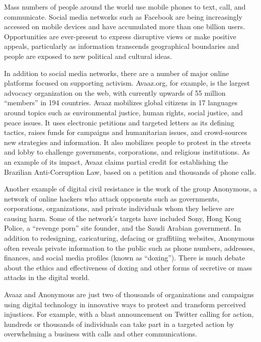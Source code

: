 \documentclass[twoside,a4paper,12pt,fleqn,openany]{extbook}
\begin{document}
Mass numbers of people around the world use mobile phones to text, call, and communicate. Social media networks such as Facebook are being increasingly accessed on mobile devices and have accumulated more than one billion users. Opportunities are ever-present to express disruptive views or make positive appeals, particularly as information transcends geographical boundaries and people are exposed to new political and cultural ideas.

In addition to social media networks, there are a number of major online platforms focused on supporting activism. Avaaz.org, for example, is the largest advocacy organization on the web, with currently upwards of 55 million “members” in 194 countries. Avaaz mobilizes global citizens in 17 languages around topics such as environmental justice, human rights, social justice, and peace issues. It uses electronic petitions and targeted letters as its defining tactics, raises funds for campaigns and humanitarian issues, and crowd-sources new strategies and information. It also mobilizes people to protest in the streets and lobby to challenge governments, corporations, and religious institutions. As an example of its impact, Avaaz claims partial credit for establishing the Brazilian Anti-Corruption Law, based on a petition and thousands of phone calls.

Another example of digital civil resistance is the work of the group Anonymous, a network of online hackers who attack opponents such as governments, corporations, organizations, and private individuals whom they believe are causing harm. Some of the network’s targets have included Sony, Hong Kong Police, a “revenge porn” site founder, and the Saudi Arabian government. In addition to redesigning, caricaturing, defacing or graffitiing websites, Anonymous often reveals private information to the public such as phone numbers, addresses, finances, and social media profiles (known as “doxing”). There is much debate about the ethics and effectiveness of doxing and other forms of secretive or mass attacks in the digital world.

Avaaz and Anonymous are just two of thousands of organizations and campaigns using digital technology in innovative ways to protest and transform perceived injustices. For example, with a blast announcement on Twitter calling for action, hundreds or thousands of individuals can take part in a targeted action by overwhelming a business with calls and other communications.
\end{document}
